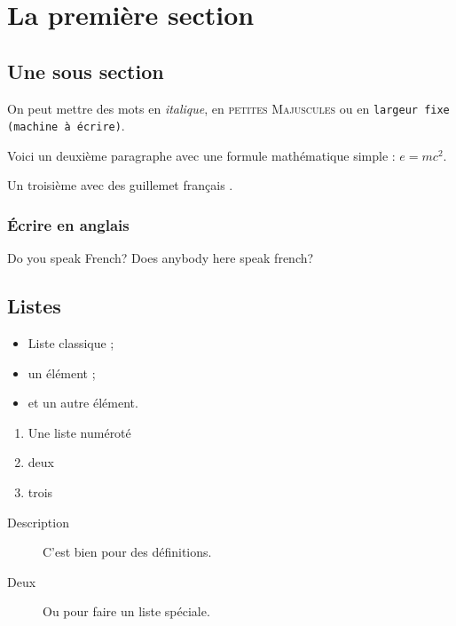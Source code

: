 \section{La première section}

%
\subsection{Une sous section}

On peut mettre des mots en \emph{italique},
en \textsc{petites Majuscules} ou
en \texttt{largeur fixe (machine à écrire)}.

Voici un deuxième paragraphe avec une formule mathématique simple : $e = mc^2$.

Un troisième avec des \og guillemet français \fg{}.


%
\subsubsection{Écrire en anglais}

\foreignlanguage{english}{Do you speak French? Does anybody here speak french?}


%
\subsection{Listes}

\begin{itemize}
\item Liste classique ;
\item un élément ;
\item et un autre élément.
\end{itemize}
\vspace{\parskip} %

\begin{enumerate}
\item Une liste numéroté
\item deux
\item trois
\end{enumerate}
\vspace{\parskip}

\begin{description}
\item[Description] C'est bien pour des définitions.
\item[Deux] Ou pour faire un liste spéciale.
\end{description}
\vspace{\parskip}


